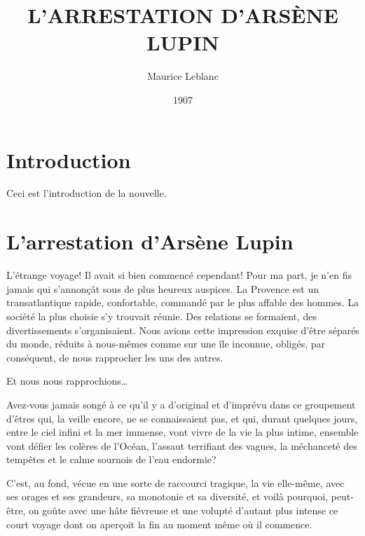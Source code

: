\documentclass[12pt,a4paper]{book}
\begin{document}
\title{L’ARRESTATION D’ARSÈNE LUPIN}
\author{Maurice Leblanc}
\date{1907}

\maketitle



\frontmatter
	\chapter{Introduction}
	
	Ceci est l'introduction de la nouvelle. 

\mainmatter

\chapter*{L'arrestation d'Arsène Lupin}

L’étrange voyage! Il avait si bien commencé cependant! Pour ma part, je n’en fis jamais qui s’annonçât sous de plus heureux auspices. La Provence est un transatlantique rapide, confortable, commandé par le plus affable des hommes. La société la plus choisie s’y trouvait réunie. Des relations se formaient, des divertissements s’organisaient. Nous avions cette impression exquise d’être séparés du monde, réduits à nous-mêmes comme sur une île inconnue, obligés, par conséquent, de nous rapprocher les uns des autres.

Et nous nous rapprochions…

Avez-vous jamais songé à ce qu’il y a d’original et d’imprévu dans ce groupement d’êtres qui, la veille encore, ne se connaissaient pas, et qui, durant quelques jours, entre le ciel infini et la mer immense, vont vivre de la vie la plus intime, ensemble vont défier les colères de l’Océan, l’assaut terrifiant des vagues, la méchanceté des tempêtes et le calme sournois de l’eau endormie?

C’est, au fond, vécue en une sorte de raccourci tragique, la vie elle-même, avec ses orages et ses grandeurs, sa monotonie et sa diversité, et voilà pourquoi, peut-être, on goûte avec une hâte fiévreuse et une volupté d’autant plus intense ce court voyage dont on aperçoit la fin au moment même où il commence.
\end{document}
